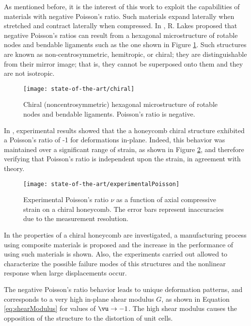   As mentioned before, it is the interest of this work to exploit the capabilities of materials with negative Poisson's ratio. Such materials expand laterally when stretched and contract laterally when compressed. In \cite{Lakes1991}, R. Lakes proposed that negative Poisson's ratios can result from a hexagonal microstructure of rotable nodes and bendable ligaments such as the one shown in Figure \ref{fig:chiral}. Such structures are known as non-centrosymmetric, hemitropic, or chiral; they are distinguishable from their mirror image; that is, they cannot be superposed onto them and they are not isotropic.

  \begin{figure}[!htpb]
    \centering
    \texttt{[image: state-of-the-art/chiral]}
    \caption[Chiral structure of rotable nodes and bendable ligaments]{Chiral (noncentrosymmetric) hexagonal microstructure of rotable nodes and bendable ligaments. Poisson's ratio is negative. \cite{Lakes1991}}\label{fig:chiral}
  \end{figure}

  In \cite{Prall1997}, experimental results showed that the a honeycomb chiral structure exhibited a Poisson's ratio of -1 for deformations in-plane. Indeed, this behavior was maintained over a significant range of strain, as shown in Figure \ref{fig:experimentalPoisson}, and therefore verifying that Poisson's ratio is independent upon the strain, in agreement with theory. 

  \begin{figure}[!htpb]
    \centering
    \texttt{[image: state-of-the-art/experimentalPoisson]}
    \caption[Experimental Poisson's ratio $v$ as a function of axial compressive strain on a chiral honeycomb]{Experimental Poisson's ratio $\nu$ as a function of axial compressive strain on a chiral honeycomb. The error bars represent inaccuracies due to the measurement resolution. \cite{Prall1997}}\label{fig:experimentalPoisson}
  \end{figure}

  In \cite{Bettini2010} the properties of a chiral honeycomb are investigated, a manufacturing process using composite materials is proposed and the increase in the performance of using such materials is shown. Also, the experiments carried out allowed to characterize the possible failure modes of this structures and the nonlinear response when large displacements occur.

  The negative Poisson’s ratio behavior leads to unique deformation patterns, and corresponds to a very high in-plane shear modulus $G$, as shown in Equation \ref{eq:shearModulus} for values of $\vu \to -1$. The high shear modulus causes the opposition of the structure to the distortion of unit cells.

